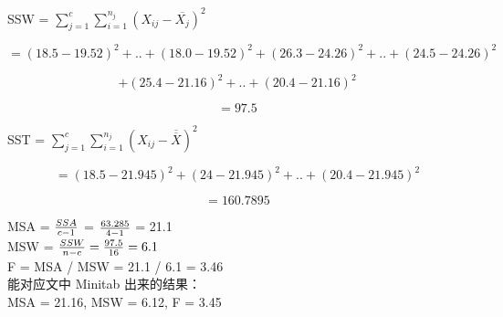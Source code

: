 SSW = \(\sum_{j=1}^c \sum_{i=1}^{n_j} (X_{ij} - \overline{X_j})^2\)

\[=(18.5 - 19.52)^2 + . . + (18.0 - 19.52)^2 + (26.3 - 24.26)^2 + . . + (24.5 - 24.26)^2\]

\[+(25.4 - 21.16)^2 + . . + (20.4 - 21.16)^2\]

\[= 97.5\]

SST =
\(\sum_{j=1}^c \sum_{i=1}^{n_j} (X_{ij} - \overline{\overline{X}})^2\)

\[= (18.5 - 21.945)^2 + (24 - 21.945)^2 + ..+ (20.4 - 21.945)^2\]

\[= 160.7895\]

MSA = \({SSA \over c-1}\) = \({63.285 \over 4-1}\) = 21.1\\
MSW = \({SSW \over n -c} = {97.5 \over 16}= 6.1\)\\
F = MSA / MSW = 21.1 / 6.1 = 3.46\\
能对应文中 Minitab 出来的结果：\\
MSA = 21.16, MSW = 6.12, F = 3.45\\


